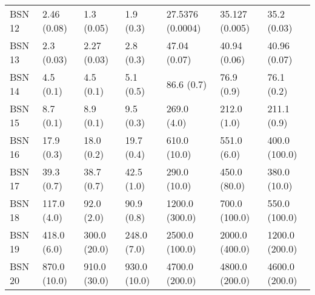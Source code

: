 \begin{tabular}{lllllll}
BSN 12 &       2.46 (0.08) &         1.3 (0.05) &             1.9 (0.3) &        27.5376 (0.0004) &           35.127 (0.005) &                 35.2 (0.03) \\
BSN 13 &        2.3 (0.03) &        2.27 (0.03) &             2.8 (0.3) &            47.04 (0.07) &             40.94 (0.06) &                40.96 (0.07) \\
BSN 14 &         4.5 (0.1) &          4.5 (0.1) &             5.1 (0.5) &              86.6 (0.7) &               76.9 (0.9) &                  76.1 (0.2) \\
BSN 15 &         8.7 (0.1) &          8.9 (0.1) &             9.5 (0.3) &             269.0 (4.0) &              212.0 (1.0) &                 211.1 (0.9) \\
BSN 16 &        17.9 (0.3) &         18.0 (0.2) &            19.7 (0.4) &            610.0 (10.0) &              551.0 (6.0) &               400.0 (100.0) \\
BSN 17 &        39.3 (0.7) &         38.7 (0.7) &            42.5 (1.0) &            290.0 (10.0) &             450.0 (80.0) &                380.0 (10.0) \\
BSN 18 &       117.0 (4.0) &         92.0 (2.0) &            90.9 (0.8) &          1200.0 (300.0) &            700.0 (100.0) &               550.0 (100.0) \\
BSN 19 &       418.0 (6.0) &       300.0 (20.0) &           248.0 (7.0) &          2500.0 (100.0) &           2000.0 (400.0) &              1200.0 (200.0) \\
BSN 20 &      870.0 (10.0) &       910.0 (30.0) &          930.0 (10.0) &          4700.0 (200.0) &           4800.0 (200.0) &              4600.0 (200.0) \\
\bottomrule
\end{tabular}
